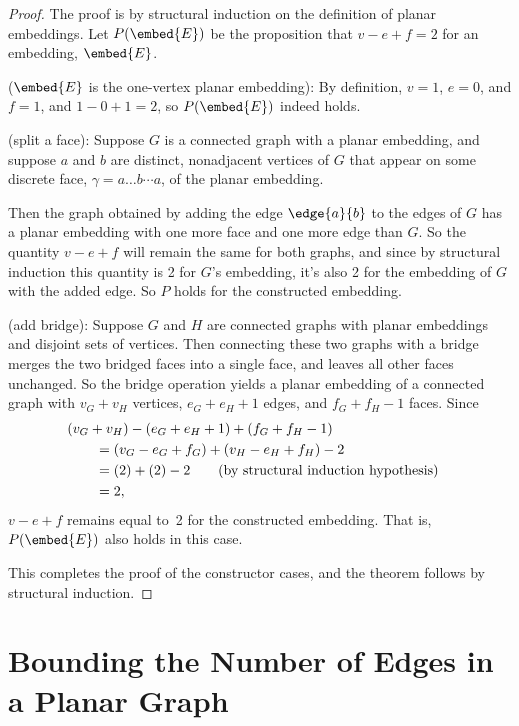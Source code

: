 \begin{proof}
The proof is by structural induction on the definition of planar
embeddings.  Let $P(\embed{E})$ be the proposition that $v - e + f = 2$ for an
embedding, $\embed{E}$.

 ($\embed{E}$ is the one-vertex planar
embedding): By definition, $v=1$, $e=0$, and $f=1$, and $1-0+1 =2$, so
$P(\embed{E})$ indeed holds.

 (split a face): Suppose $G$ is a
connected graph with a planar embedding, and suppose $a$ and $b$ are
distinct, nonadjacent vertices of $G$ that appear on some discrete
face, $\gamma= a \dots b \cdots a$, of the planar embedding.

Then the graph obtained by adding the edge $\edge{a}{b}$ to the edges of
$G$ has a planar embedding with one more face and one more edge than $G$.
So the quantity $v-e+f$ will remain the same for both graphs, and since by
structural induction this quantity is 2 for $G$'s embedding, it's also 2
for the embedding of $G$ with the added edge.  So $P$ holds for the
constructed embedding.

 (add bridge): Suppose $G$ and $H$ are
connected graphs with planar embeddings and disjoint sets of vertices.
Then connecting these two graphs with a bridge merges the two bridged
faces into a single face, and leaves all other faces unchanged.  So
the bridge operation yields a planar embedding of a connected graph
with $v_G +v_H$ vertices, $e_G + e_H +1$ edges, and $f_G + f_H - 1$
faces.  Since
\begin{align*}
\lefteqn{(v_G +v_H) - (e_G + e_H +1) + (f_G + f_H - 1)} \qquad\\
   & = (v_G  - e_G + f_G) + (v_H  - e_H  + f_H) -2\\
   & = (2)+(2)-2 \qquad \text{(by structural induction hypothesis)}\\
   & = 2,
\end{align*}
$v-e+f$ remains equal to~2 for the constructed embedding.  That is,
$P(\embed{E})$ also holds in this case.

This completes the proof of the constructor cases, and the theorem follows
by structural induction.
\end{proof}

\section{Bounding the Number of Edges in a Planar Graph}

